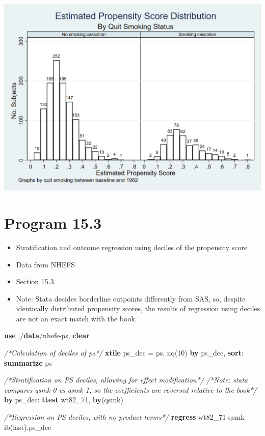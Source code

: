 \documentclass[
  10pt,
]{book}
\newenvironment{Shaded}{\begin{snugshade}}{\end{snugshade}}
\newcommand{\CommentTok}[1]{\textcolor[rgb]{0.56,0.35,0.01}{\textit{#1}}}
\newcommand{\FunctionTok}[1]{\textcolor[rgb]{0.00,0.00,0.00}{#1}}
\newcommand{\KeywordTok}[1]{\textcolor[rgb]{0.13,0.29,0.53}{\textbf{#1}}}
\newcommand{\NormalTok}[1]{#1}
\providecommand{\tightlist}{%
  \setlength{\itemsep}{0pt}\setlength{\parskip}{0pt}}
\begin{document}
\begin{center}\includegraphics[width=0.85\linewidth]{./figs/stata-fig-15-2} \end{center}

\hypertarget{program-15.3}{%
\section{Program 15.3}\label{program-15.3}}

\begin{itemize}
\tightlist
\item
  Stratification and outcome regression using deciles of the propensity score
\item
  Data from NHEFS
\item
  Section 15.3
\item
  Note: Stata decides borderline cutpoints differently from SAS, so, despite identically distributed propensity scores, the results of regression using deciles are not an exact match with the book.
\end{itemize}

\begin{Shaded}
\begin{Highlighting}[]
\KeywordTok{use}\NormalTok{ ./}\KeywordTok{data}\NormalTok{/nhefs-ps, }\KeywordTok{clear}

\CommentTok{/*Calculation of deciles of ps*/}
\KeywordTok{xtile}\NormalTok{ ps_dec = ps, nq(10)}
\KeywordTok{by}\NormalTok{ ps_dec, }\KeywordTok{sort}\NormalTok{: }\KeywordTok{summarize}\NormalTok{ ps}

\CommentTok{/*Stratification on PS deciles, allowing for effect modification*/}
\CommentTok{/*Note: stata compares qsmk 0 vs qsmk 1, so the coefficients are reversed relative to the book*/}
\KeywordTok{by}\NormalTok{ ps_dec: }\KeywordTok{ttest}\NormalTok{ wt82_71, }\KeywordTok{by}\NormalTok{(qsmk)}

\CommentTok{/*Regression on PS deciles, with no product terms*/}
\KeywordTok{regress}\NormalTok{ wt82_71 qsmk ib(}\FunctionTok{last}\NormalTok{).ps_dec}
\end{Highlighting}
\end{Shaded}
\end{document}
